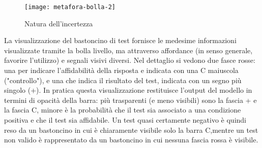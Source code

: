 \begin{figure}[!ht] 
    \centering 
    \texttt{[image: metafora-bolla-2]} 
    \caption{Natura dell'incertezza}
\end{figure}

La visualizzazione del bastoncino di test fornisce le medesime informazioni visualizzate tramite la
bolla livello, ma attraverso affordance (in senso generale, favorire l'utilizzo) e segnali visivi diversi.
Nel dettaglio si vedono due fasce rosse: una per indicare l'affidabilità della risposta e indicata con
una C maiuscola ("controllo"), e una che indica il risultato del test, indicata con un segno più
singolo (+). In pratica questa visualizzazione restituisce l'output del modello in termini di opacità
della barra: più trasparenti (e meno visibili) sono la fascia + e la fascia C, minore è la probabilità
che il test sia associato a una condizione positiva e che il test sia affidabile. Un
test quasi certamente negativo è quindi reso da un bastoncino in cui è chiaramente visibile solo la
barra C,mentre un test non valido è rappresentato da un bastoncino in cui nessuna fascia rossa è
visibile.
